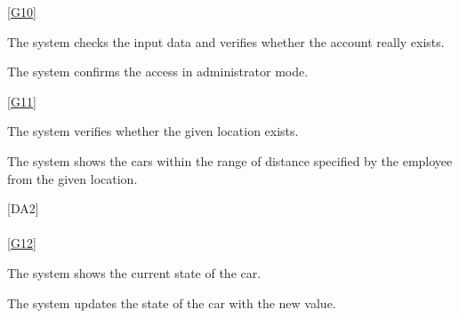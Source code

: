 \documentclass[11pt,a4paper]{report}
\begin{document}
\noindent\ref{G10} \\
\begin{Req}[start = 5]
\item The system checks the input data and verifies whether the account really exists.
\end{Req}
\begin{Req}[start = 28]
\item The system confirms the access in administrator mode.
\end{Req}
\noindent\ref{G11} \\
\begin{Req}[start = 7]
\item The system verifies whether the given location exists.
\end{Req}
\begin{Req}[start = 29]
\item The system shows the cars within the range of distance specified by the employee from the given location.
\end{Req}
\hspace{0.4cm}[DA2] \\
\noindent\\
\ref{G12} \\
\begin{Req}[resume]
\item The system shows the current state of the car.
\item The system updates the state of the car with the new value.
\end{Req}
\end{document}
